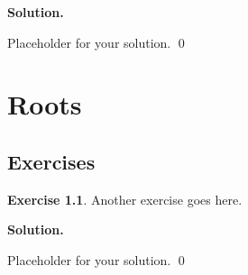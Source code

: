 \documentclass[12pt]{book}
\theoremstyle{definition}
\newtheorem{exercise}{Exercise}[chapter]
\newenvironment{solution}
{%
  \par\noindent\textbf{Solution.}\quad
}
{%
  \qed\par
}
\begin{document}
\begin{solution}
Placeholder for your solution.
\end{solution}

\chapter{Roots}
\section{Exercises}

\begin{exercise}
Another exercise goes here.
\end{exercise}

\begin{solution}
Placeholder for your solution.
\end{solution}

\end{document}
